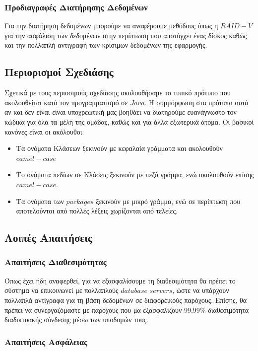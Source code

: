\documentclass[12pt]{article}
\begin{document}
\subsubsection{Προδιαγραφές Διατήρησης Δεδομένων}

Για την διατήρηση δεδομένων μπορούμε να αναφέρουμε μεθόδους όπως η $RAID-V$ για την ασφάλιση των δεδομένων στην περίπτωση που αποτύγχει ένας δίσκος καθώς και την πολλαπλή αντιγραφή των κρίσιμων δεδομένων της εφαρμογής.

\subsection{Περιορισμοί Σχεδιάσης}

Σχετικά με τους περιοσιμούς σχεδίασης ακολουθήσαμε το τυπικό πρότυπο που ακολουθείται κατά τον προγραμματισμό σε $Java$. Η συμμόρφωση στα πρότυπα αυτά αν και δεν είναι είναι υποχρεωτική μας βοηθάει να διατηρούμε ευανάγνωστο τον κώδικα για όλα τα μέλη της ομάδας, καθώς και για άλλα εξωτερικά άτομα. Οι βασικοί κανόνες είναι οι ακόλουθοι:

\begin{itemize}
\item Τα ονόματα Κλάσεων ξεκινούν με κεφαλαία γράμματα και ακολουθούν $camel-case$
\item Το ονόματα πεδίων σε Κλάσεις ξεκινούν με πεζό γράμμα, ενώ ακολουθούν επίσης $camel-case$.
\item Τα ονόματα των $packages$ ξεκινούν με μικρό γράμμα, ενώ σε περίπτωση που αποτελούνται από πολλές λέξεις χωρίζονται από τελείες. 
\end{itemize}

\subsection{Λοιπές Απαιτήσεις}

\subsubsection{Απαιτήσεις Διαθεσιμότητας}

Όπως έχει ήδη αναφερθεί, για να εξασφαλίσουμε τη διαθεσιμότητα θα πρέπει το σύστημα να επικοινωνεί με πολλαπλούς $database$ $servers$, ώστε να υπάρχουν πολλαπλά αντίγραφα για τη βάση δεδομένων σε διαφορεικούς παρόχους. Επίσης, θα πρέπει να συνεργαζόμαστε με παρόχους που μα εξασφαλίζουν 99.99\% διαθεσιμότητα διαδικτυακής σύνδεσης μέσω των υποδομών τους.

\subsubsection{Απαιτήσεις Ασφάλειας}
\end{document}
